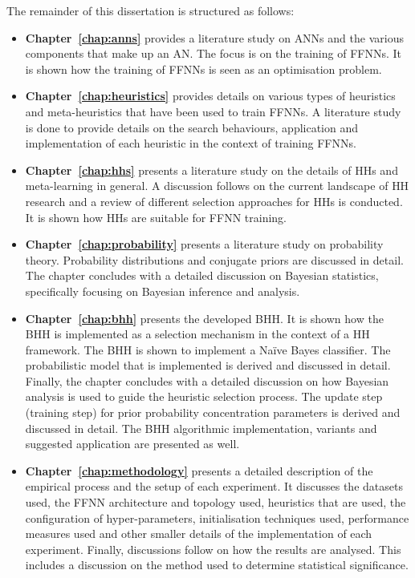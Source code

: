 The remainder of this dissertation is structured as follows:

\begin{itemize}
      \item \textbf{Chapter~\ref{chap:anns}} provides a literature study on \acp{ANN} and the various components that make up an \acl{AN}. The focus is on the training of \acp{FFNN}. It is shown how the training of \acp{FFNN} is seen as an optimisation problem.

      \item \textbf{Chapter~\ref{chap:heuristics}} provides details on various types of heuristics and meta-heuristics that have been used to train \acp{FFNN}. A literature study is done to provide details on the search behaviours, application and implementation of each heuristic in the context of training \acp{FFNN}.

      \item \textbf{Chapter~\ref{chap:hhs}} presents a literature study on the details of \acp{HH} and meta-learning in general. A discussion follows on the current landscape of \ac{HH} research and a review of different selection approaches for \acp{HH} is conducted. It is shown how \acp{HH} are suitable for \acs{FFNN} training.

      \item \textbf{Chapter~\ref{chap:probability}} presents a literature study on probability theory. Probability distributions and conjugate priors are discussed in detail. The chapter concludes with a detailed discussion on Bayesian statistics, specifically focusing on Bayesian inference and analysis.

      \item \textbf{Chapter~\ref{chap:bhh}} presents the developed \Ac{BHH}. It is shown how the \Ac{BHH} is implemented as a selection mechanism in the context of a \ac{HH} framework. The \Ac{BHH} is shown to implement a Na\"ive Bayes classifier. The probabilistic model that is implemented is derived and discussed in detail. Finally, the chapter concludes with a detailed discussion on how Bayesian analysis is used to guide the heuristic selection process. The update step (training step) for prior probability concentration parameters is derived and discussed in detail. The \Ac{BHH} algorithmic implementation, variants and suggested application are presented as well.

      \item \textbf{Chapter~\ref{chap:methodology}} presents a detailed description of the empirical process and the setup of each experiment. It discusses the datasets used, the \ac{FFNN} architecture and topology used, heuristics that are used, the configuration of hyper-parameters, initialisation techniques used, performance measures used and other smaller details of the implementation of each experiment.  Finally, discussions follow on how the results are analysed. This includes a discussion on the method used to determine statistical significance.


\end{itemize}
